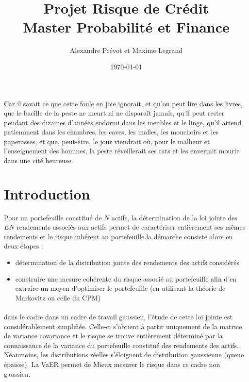 \documentclass{article}
\title{\textbf{Projet Risque de Cr\'{e}dit \\
Master Probabilit\'{e} et Finance } 
}
\date{\today}
\author{Alexandre Pr\'evot et Maxime Legrand}
\begin{document}
\maketitle
\newpage 
\newsavebox{\auteurbm}
\newenvironment{Bonmot}[1]%
  {\small\slshape%
  \savebox{\auteurbm}{\upshape\sffamily#1}%
  \begin{flushright}}
  {\usebox{\auteurbm}
  \end{flushright}\normalsize\upshape}
 \begin{Bonmot}{La peste, Albert Camus}
  Car il savait ce que cette foule en joie ignorait, et qu'on peut lire dans les livres, que le bacille de la peste ne meurt ni ne disparaît jamais, qu'il peut rester pendant des dizaines d'années endormi dans les meubles et le linge, qu'il attend patiemment dans les chambres, les caves, les malles, les mouchoirs et les paperasses, et que, peut-être, le jour viendrait où, pour le malheur et l'enseignement des hommes, la peste réveillerait ses rats et les enverrait mourir dans une cité heureuse.
\end{Bonmot}
\newpage 
\tableofcontents
\section{Introduction}
\paragraph{ }
Pour un portefeuille constitué de $ N $ actifs, la détermination de la loi jointe des $EN  $ rendements  associés aux actifs permet de caractériser entièrement ses mêmes rendements et le risque inhérent au portefeuille.la démarche consiste alors en deux étapes :
\begin{itemize}
\item détermination de la distribution jointe des rendements des actifs considérés
\item construire une mesure cohérente du risque associé au portefeuille afin d'en extraire un moyen d'optimiser le portefeuille (en utilisant la théorie de Markovitz  ou celle du CPM)

\end{itemize}
\paragraph{ }dans le cadre
dans un cadre de travail gaussien, l'étude de cette loi jointe est considérablement simplifiée. Celle-ci  s'obtient à partir uniquement de la matrice de variance covariance  et le risque se trouve entièrement déterminé par la connaissance de la variance du portefeuille constitué  des rendements des actifs. Néanmoins,  les distributions réelles s'éloignent de distribution gaussienne (queue épaisse). La VaER permet de Mieux mesurer le risque dans ce cadre non gaussien.
\end{document}
